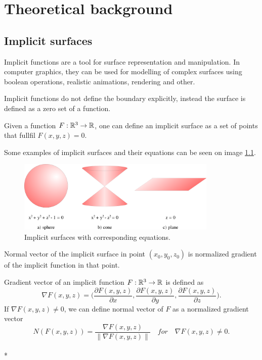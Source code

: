 \chapter{Theoretical background}
\label{chap2} %

\section{Implicit surfaces}
\label{sub2.1}

Implicit functions are a tool for surface representation and manipulation.
In computer graphics, they can be used for modelling of complex surfaces
using boolean operations, realistic animations, rendering and other.

Implicit functions do not define the boundary explicitly, instead
the surface is defined as a zero set of a function.
\begin{definition}
    Given a function $F: \mathbb{R}^3 \to \mathbb{R}$, one can define an implicit surface
    as a set of points that fullfil $F(x, y, z) = 0$.
\end{definition}

Some examples of implicit surfaces and their equations can be seen on
image \ref{img:1}.

\begin{figure}
    \centerline{\includegraphics[width=0.85\textwidth]{images/img1}}
    \caption[Implicit surfaces with corresponding equations]
    {Implicit surfaces with corresponding equations.}
    \label{img:1}
\end{figure}

Normal vector of the implicit surface in point $(x_0, y_0, z_0)$ is
normalized gradient of the implicit function in that point.

\begin{definition}
    Gradient vector of an implicit function $F:\mathbb{R}^3 \to \mathbb{R}$ is defined as 
    $$\nabla F(x, y, z) = \bigg(\frac{\partial F(x, y, z)}{\partial x}, \frac{\partial F(x, y, z)}{\partial y}, 
    \frac{\partial F(x, y, z)}{\partial z}\bigg).$$
    If $\nabla F(x,y,z) \neq 0$, we can define normal vector of $F$ as 
    a normalized gradient vector
    $$N(F(x, y, z))  = \frac{\nabla F(x, y, z)}{\| \nabla F(x, y, z) \|} \,\,\,\,\,\, for \,\,\,\,\,\,
    \nabla F(x,y,z) \neq 0.$$
    \\*
\end{definition}

